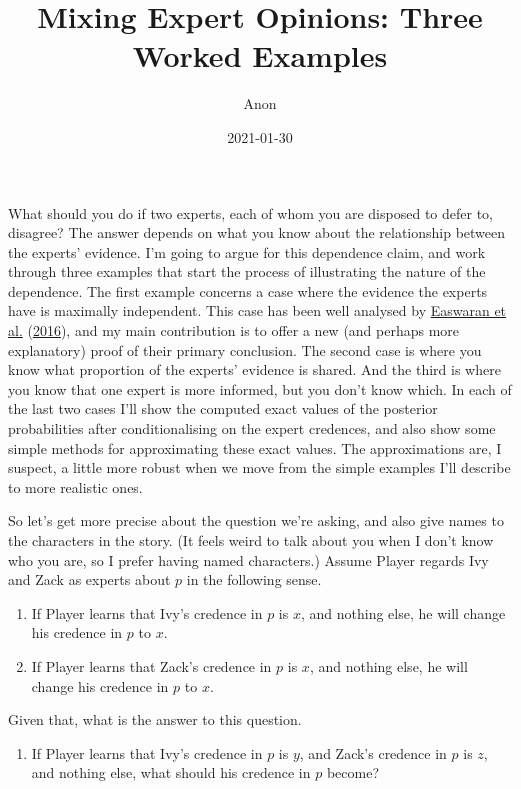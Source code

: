 \documentclass[
  12pt,
]{article}
\title{Mixing Expert Opinions: Three Worked Examples}
\author{Anon}
\date{2021-01-30}
\providecommand{\tightlist}{%
  \setlength{\itemsep}{0pt}\setlength{\parskip}{0pt}}
\begin{document}
\maketitle

What should you do if two experts, each of whom you are disposed to
defer to, disagree? The answer depends on what you know about the
relationship between the experts' evidence. I'm going to argue for this
dependence claim, and work through three examples that start the process
of illustrating the nature of the dependence. The first example concerns
a case where the evidence the experts have is maximally independent.
This case has been well analysed by
\protect\hyperlink{ref-EaswaranEtAl2016}{Easwaran et al.}
(\protect\hyperlink{ref-EaswaranEtAl2016}{2016}), and my main
contribution is to offer a new (and perhaps more explanatory) proof of
their primary conclusion. The second case is where you know what
proportion of the experts' evidence is shared. And the third is where
you know that one expert is more informed, but you don't know which. In
each of the last two cases I'll show the computed exact values of the
posterior probabilities after conditionalising on the expert credences,
and also show some simple methods for approximating these exact values.
The approximations are, I suspect, a little more robust when we move
from the simple examples I'll describe to more realistic ones.

So let's get more precise about the question we're asking, and also give
names to the characters in the story. (It feels weird to talk about you
when I don't know who you are, so I prefer having named characters.)
Assume Player regards Ivy and Zack as experts about \(p\) in the
following sense.

\begin{enumerate}
\def\labelenumi{(\arabic{enumi})}
\tightlist
\item
  If Player learns that Ivy's credence in \(p\) is \(x\), and nothing
  else, he will change his credence in \(p\) to \(x\).
\item
  If Player learns that Zack's credence in \(p\) is \(x\), and nothing
  else, he will change his credence in \(p\) to \(x\).
\end{enumerate}

Given that, what is the answer to this question.

\begin{enumerate}
\def\labelenumi{(\arabic{enumi})}
\setcounter{enumi}{2}
\tightlist
\item
  If Player learns that Ivy's credence in \(p\) is \(y\), and Zack's
  credence in \(p\) is \(z\), and nothing else, what should his credence
  in \(p\) become?
\end{enumerate}
\end{document}
